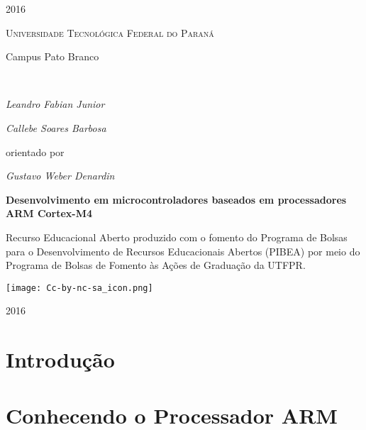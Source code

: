 \documentclass[a4paper,10pt,oneside]{book}
\begin{document}
\begin{titlepage}
	{\large2016\par}
	\newpage
 \vfill
  \begin{center}
   {\scshape \LARGE Universidade Tecnológica Federal do Paraná\par\vspace{5pt} \Large Campus Pato Branco} \\[2.5cm]

   \begin{minipage}{\textwidth}
		\centering
		\Large\itshape Leandro Fabian Junior\par
		\Large\itshape Callebe Soares Barbosa\par
	\end{minipage}
	\vspace{1cm}
	
	{orientado por\par
	\Large\itshape Gustavo Weber Denardin}
	\vfill

   {\huge\bfseries Desenvolvimento em microcontroladores baseados em processadores ARM Cortex-M4\par}
   \vfill

   \hspace{.45\textwidth} %
   \begin{minipage}{.5\textwidth}
   \large Recurso Educacional Aberto produzido com o fomento do Programa de Bolsas para o Desenvolvimento de Recursos Educacionais Abertos (PIBEA) por meio do Programa de Bolsas de Fomento às Ações de Graduação da UTFPR.
  \end{minipage}
  \vfill
  \hspace{11cm}
  \texttt{[image: Cc-by-nc-sa\_icon.png]}
	
\vspace{2cm}

{\large2016\par}
\end{center}
\end{titlepage} 

\setcounter{page}{2}
\listoffigures
\listoftables

\dominitoc
\nomtcrule
\tableofcontents

\chapter{Introdução}


\chapter{Conhecendo o Processador ARM}

\end{document}
